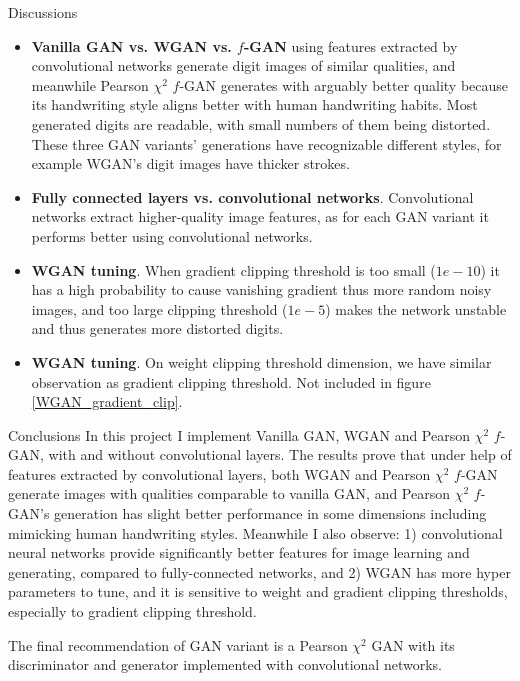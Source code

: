 \documentclass[final]{beamer}
\newlength{\colwidth}
\begin{document}
\begin{frame}[t]
\begin{columns}[t]
\begin{column}{\colwidth}
  \begin{block}{Discussions}
\begin{itemize}
    \item {\bf Vanilla GAN vs. WGAN vs. $f$-GAN} using features extracted by convolutional networks generate digit images of similar qualities, and meanwhile Pearson $\chi^2$ $f$-GAN generates with arguably better quality because its handwriting style aligns better with human handwriting habits. Most generated digits are readable, with small numbers of them being distorted. These three GAN variants' generations have recognizable different styles, for example WGAN's digit images have thicker strokes.
    \item {\bf Fully connected layers vs. convolutional networks}. Convolutional networks extract higher-quality image features, as for each GAN variant it performs better using convolutional networks.
    \item {\bf WGAN tuning}. When gradient clipping threshold is too small ($1e-10$) it has a high probability to cause vanishing gradient thus more random noisy images, and too large clipping threshold ($1e-5$) makes the network unstable and thus generates more distorted digits.   
    \item {\bf WGAN tuning}. On weight clipping threshold dimension, we have similar observation as gradient clipping threshold. Not included in figure \ref{WGAN_gradient_clip}. 

\end{itemize}  



  \end{block}

  \begin{block}{Conclusions}
In this project I implement Vanilla GAN, WGAN and Pearson $\chi^2$ $f$-GAN, with and without convolutional layers. The results prove that under help of features extracted by convolutional layers, both WGAN and Pearson $\chi^2$ $f$-GAN generate images with qualities comparable to vanilla GAN, and Pearson $\chi^2$ $f$-GAN's generation has slight better performance in some dimensions including mimicking human handwriting styles. Meanwhile I also observe: 1) convolutional neural networks provide significantly better features for image learning and generating, compared to fully-connected networks, and 2) WGAN has more hyper parameters to tune, and it is sensitive to weight and gradient clipping thresholds, especially to gradient clipping threshold.

The final recommendation of GAN variant is a Pearson $\chi^2$ GAN with its discriminator and generator implemented with convolutional networks.
  \end{block}
  

\end{column}
\end{columns}
\end{frame}
\end{document}

